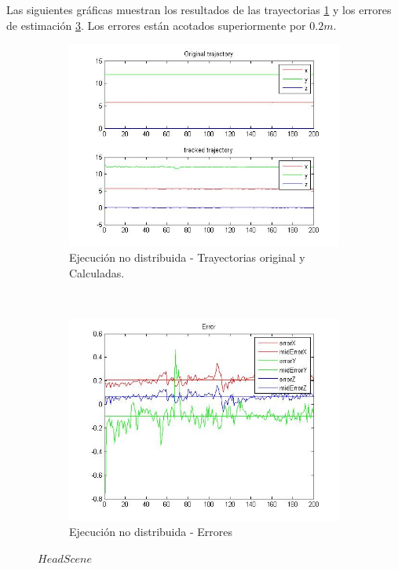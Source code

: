 	Las siguientes gr\'aficas muestran los resultados de las trayectorias \ref{fig:trajectories_PC} y los errores de estimaci\'on   \ref{fig:errors_PC}. Los errores est\'an acotados superiormente por $0.2 m$.
	\begin{figure}
	     \centering
	     \begin{subfigure}[b]{0.4\textwidth}
			\includegraphics[width=\linewidth]{../Images/c4/trajs}
			\caption{Ejecuci\'on no distribuida  - Trayectorias original y Calculadas.}
			\label{fig:trajectories_PC} 
	     \end{subfigure}%
	     ~
	     \begin{subfigure}[b]{0.4\textwidth}
			\includegraphics[width=\linewidth]{../Images/c4/errors}
			\caption{Ejecuci\'on no distribuida - Errores}
			\label{fig:errors_PC}
	     \end{subfigure}
	     \caption{$Head Scene$}
	\end{figure}

